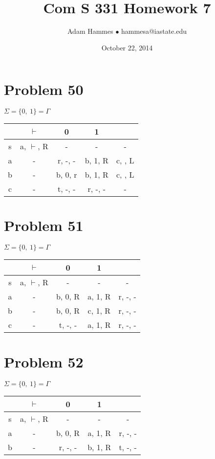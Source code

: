 \documentclass[11pt]{article}
\begin{document}
\title{Com S 331 Homework 7}
\author{Adam Hammes $\bullet$ hammesa@iastate.edu}
\date{October 22, 2014}
\maketitle

\section*{Problem 50}

$\Sigma = \{0,\ 1\} = \Gamma$

\begin{tabular}{ c | c | c | c | c }
			& $\vdash$ 			& 0 					& 1 				& \textvisiblespace \\
			\hline
	s		& a, $\vdash$, R 	& -					& -				& - \\
	a		& - 						& r, -, -				& b, 1, R		&  c, \textvisiblespace , L\\
	b		& -						& b, 0, r			& b, 1, R		& c, \textvisiblespace , L \\
	c		& -						& t, -, -				& r, -, -			& -
\end{tabular}


\section*{Problem 51}

$\Sigma = \{0,\ 1\} = \Gamma$

\begin{tabular}{ c | c | c | c | c }
			& $\vdash$				& 0 					& 1				& \textvisiblespace \\
		\hline
		s	& a, $\vdash$, R		& -					& -				& - \\
		a	& -							& b, 0, R			& a, 1, R		& r, -, - \\
		b	& -							& b, 0, R			& c, 1, R		& r, -, - \\
		c	& -							& t, -, -				& a, 1, R		& r, -, -
\end{tabular}


\section*{Problem 52}

$\Sigma = \{0,\ 1\} = \Gamma$

\begin{tabular}{ c | c | c | c | c }
			& $\vdash$				& 0 					& 1				& \textvisiblespace \\
		\hline
		s	& a, $\vdash$, R		& -					& -				& - \\
		a	& -							& b, 0, R			& a, 1, R		& r, -, - \\
		b	& -							& r, -, -				& b, 1, R		& t, -, - \\
\end{tabular}
\end{document}

